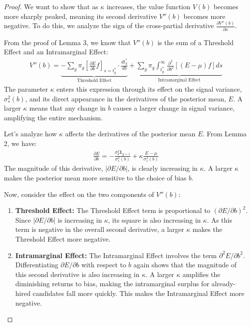     \begin{proof}
    We want to show that as $\kappa$ increases, the value function $V(b)$ becomes more sharply peaked, meaning its second derivative $V''(b)$ becomes more negative. To do this, we analyze the sign of the cross-partial derivative $\frac{\partial V''(b)}{\partial \kappa}$.
    
    From the proof of Lemma 3, we know that $V''(b)$ is the sum of a Threshold Effect and an Intramarginal Effect:
    \begin{align}
        V''(b) = \underbrace{-\sum_{g} \pi_g \left[ \frac{\partial E}{\partial b} f \right]_{s=t_g^*} \cdot \frac{dt_g^*}{db}}_{\text{Threshold Effect}} + \underbrace{\sum_{g} \pi_g \int_{t_g^*}^\infty \frac{\partial^2}{\partial b^2}\left[ (E - \mu) f \right] ds}_{\text{Intramarginal Effect}}
    \end{align}
    The parameter $\kappa$ enters this expression through its effect on the signal variance, $\sigma_s^2(b)$, and its direct appearance in the derivatives of the posterior mean, $E$. A larger $\kappa$ means that any change in $b$ causes a larger change in signal variance, amplifying the entire mechanism.
    
    Let's analyze how $\kappa$ affects the derivatives of the posterior mean $E$. From Lemma 2, we have:
    \begin{align}
        \frac{\partial E}{\partial b} = -\frac{\sigma_\theta^2 \mathbf{1}_{g=1}}{\sigma_s^2(b)} + \kappa \frac{E - \mu}{\sigma_s^2(b)}
    \end{align}
    The magnitude of this derivative, $|\partial E / \partial b|$, is clearly increasing in $\kappa$. A larger $\kappa$ makes the posterior mean more sensitive to the choice of bias $b$.
    
    Now, consider the effect on the two components of $V''(b)$:
    \begin{enumerate}
        \item \textbf{Threshold Effect:} The Threshold Effect term is proportional to $(\partial E / \partial b)^2$. Since $|\partial E / \partial b|$ is increasing in $\kappa$, its square is also increasing in $\kappa$. As this term is negative in the overall second derivative, a larger $\kappa$ makes the Threshold Effect more negative.
    
        \item \textbf{Intramarginal Effect:} The Intramarginal Effect involves the term $\partial^2 E / \partial b^2$. Differentiating $\partial E / \partial b$ with respect to $b$ again shows that the magnitude of this second derivative is also increasing in $\kappa$. A larger $\kappa$ amplifies the diminishing returns to bias, making the intramarginal surplus for already-hired candidates fall more quickly. This makes the Intramarginal Effect more negative.
    \end{enumerate}
    

\end{proof}
